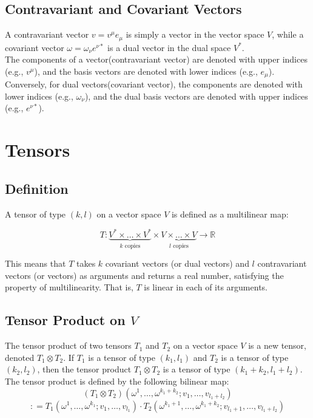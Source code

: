 \documentclass{article}
\begin{document}
\subsection{Contravariant and Covariant Vectors}

A contravariant vector \( v=v^\mu e_\mu \) is simply a vector in the vector space \( V \), while a covariant vector \( \omega=\omega_\nu e^{\nu*}\) is a dual vector in the dual space \( V^* \).\\

The components of a vector(contravariant vector) are denoted with upper indices (e.g., \(v^\mu\)), and the basis vectors are denoted with lower indices (e.g., \(e_\mu\)). Conversely, for dual vectors(covariant vector), the components are denoted with lower indices (e.g., \(\omega_\nu\)), and the dual basis vectors are denoted with upper indices (e.g., \(e^{\nu*}\)).
\section{Tensors}
\subsection{Definition}
A tensor of type \((k, l)\) on a vector space \( V \) is defined as a multilinear map:

\[
T: \underbrace{V^* \times \dots \times V^*}_{k \text{ copies}} \times \underbrace{V \times \dots \times V}_{l \text{ copies}} \rightarrow \mathbb{R}
\]

This means that \( T \) takes \( k \) covariant vectors (or dual vectors) and \( l \) contravariant vectors (or vectors) as arguments and returns a real number, satisfying the property of multilinearity. That is, \( T \) is linear in each of its arguments.
\subsection{Tensor Product on \( V \)}

The tensor product of two tensors \( T_1 \) and \( T_2 \) on a vector space \( V \) is a new tensor, denoted \( T_1 \otimes T_2 \). If \( T_1 \) is a tensor of type \((k_1, l_1)\) and \( T_2 \) is a tensor of type \((k_2, l_2)\), then the tensor product \( T_1 \otimes T_2 \) is a tensor of type \((k_1 + k_2, l_1 + l_2)\). The tensor product is defined by the following bilinear map:
\[
(T_1 \otimes T_2)(\omega^1, \dots, \omega^{k_1+k_2}; v_1, \dots, v_{l_1+l_2})\]
\[: = T_1(\omega^1, \dots, \omega^{k_1}; v_1, \dots, v_{l_1}) \cdot T_2(\omega^{k_1+1}, \dots, \omega^{k_1+k_2}; v_{l_1+1}, \dots, v_{l_1+l_2})
\]
\end{document}
